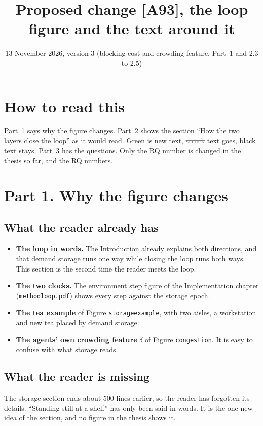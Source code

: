 \documentclass[11pt,a4paper]{article}
\title{Proposed change [A93], the loop figure and the text around it}
\date{13 November 2026, version 3 (blocking cost and crowding feature, Part~1 and 2.3 to 2.5)}
\newcommand{\new}[1]{\textcolor{newc}{#1}}
\newcommand{\old}[1]{\textcolor{gray}{\sout{#1}}}
\begin{document}
\maketitle

\section*{How to read this}
Part~1 says why the figure changes. Part~2 shows the section ``How the two
layers close the loop'' as it would read. \new{Green} is new text, \old{struck}
text goes, black text stays. Part~3 has the questions. Only the RQ number is
changed in the thesis so far, and the RQ numbers.

\section*{Part 1. Why the figure changes}

\subsection*{What the reader already has}
\begin{itemize}[leftmargin=1.2em]
\item \textbf{The loop in words.} The Introduction already explains both
  directions, and that demand storage runs one way while closing the loop runs
  both ways. This section is the second time the reader meets the loop.
\item \textbf{The two clocks.} The environment step figure of the
  Implementation chapter (\texttt{methodloop.pdf}) shows every step against the
  storage epoch.
\item \textbf{The tea example} of Figure \texttt{storageexample}, with two
  aisles, a workstation and new tea placed by demand storage.
\item \textbf{The agents' own crowding feature} $\delta$ of Figure
  \texttt{congestion}. It is easy to confuse with what storage reads.
\end{itemize}

\subsection*{What the reader is missing}
The storage section ends about 500 lines earlier, so the reader has forgotten
its details. ``Standing still at a shelf'' has only been said in words. It is
the one new idea of the section, and no figure in the thesis shows it.
\end{document}
